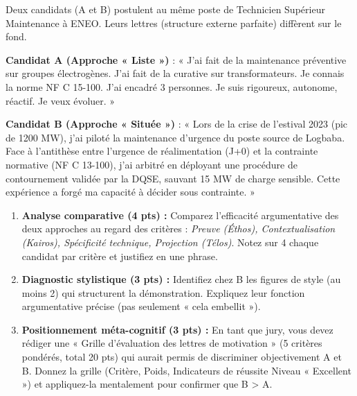 \documentclass[11pt]{article}
\begin{document}
\begin{exercice}
Deux candidats (A et B) postulent au même poste de Technicien Supérieur Maintenance à \textsc{ENEO}. Leurs lettres (structure externe parfaite) diffèrent sur le fond.

\textbf{Candidat A (Approche « Liste »)} : « J'ai fait de la maintenance préventive sur groupes électrogènes. J'ai fait de la curative sur transformateurs. Je connais la norme NF C 15-100. J'ai encadré 3 personnes. Je suis rigoureux, autonome, réactif. Je veux évoluer. »

\textbf{Candidat B (Approche « Située »)} : « Lors de la crise de l'estival 2023 (pic de 1200 MW), j'ai piloté la maintenance d'urgence du poste source de Logbaba. Face à l'antithèse entre l'urgence de réalimentation (J+0) et la contrainte normative (NF C 13-100), j'ai arbitré en déployant une procédure de contournement validée par la DQSE, sauvant 15 MW de charge sensible. Cette expérience a forgé ma capacité à décider sous contrainte. »

\begin{enumerate}
    \item \textbf{Analyse comparative (4 pts) :} Comparez l'efficacité argumentative des deux approches au regard des critères : \textit{Preuve (Éthos), Contextualisation (Kairos), Spécificité technique, Projection (Télos)}. Notez sur 4 chaque candidat par critère et justifiez en une phrase.
    \item \textbf{Diagnostic stylistique (3 pts) :} Identifiez chez B les figures de style (au moins 2) qui structurent la démonstration. Expliquez leur fonction argumentative précise (pas seulement « cela embellit »).
    \item \textbf{Positionnement méta-cognitif (3 pts) :} En tant que jury, vous devez rédiger une « Grille d'évaluation des lettres de motivation » (5 critères pondérés, total 20 pts) qui aurait permis de discriminer objectivement A et B. Donnez la grille (Critère, Poids, Indicateurs de réussite Niveau « Excellent ») et appliquez-la mentalement pour confirmer que B > A.
\end{enumerate}
\end{exercice}
\end{document}
